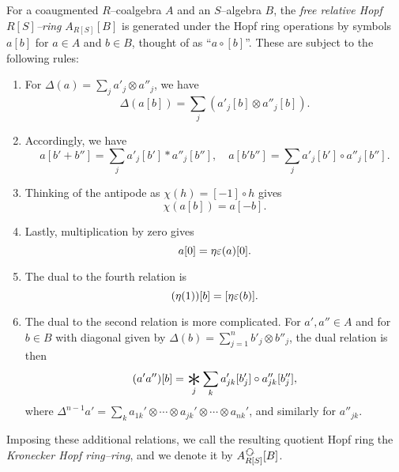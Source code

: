 \begin{definition}\label{DefnAlgebraicModelOfCoopns}
For a coaugmented \(R\)--coalgebra \(A\) and an \(S\)--algebra \(B\), the \textit{free relative Hopf \(R[S]\)--ring} \(A_{R[S]}[B]\) is generated under the Hopf ring operations by symbols \(a[b]\) for \(a \in A\) and \(b \in B\), thought of as ``\(a \circ [b]\)''.  These are subject to the following rules:
\begin{enumerate}
    \item For \(\Delta(a) = \sum_j a'_j \otimes a''_j\), we have \[\Delta(a[b]) = \sum_j (a'_j[b] \otimes a''_j[b]).\]
    \item Accordingly, we have \[a [b' + b''] = \sum_j a'_j[b'] \ast a''_j[b''], \quad a [b' b''] = \sum_j a'_j[b'] \circ a''_j[b''].\]
    \item Thinking of the antipode as \(\chi(h) = [-1] \circ h\) gives \[\chi(a[b]) = a[-b].\]
    \item Lastly, multiplication by zero gives \[a[0] = \eta\varepsilon(a)[0].\]
    \item The dual to the fourth relation is \[(\eta(1))[b] = [\eta\varepsilon(b)].\]
    \item The dual to the second relation is more complicated.  For \(a', a'' \in A\) and for \(b \in B\) with diagonal given by \(\Delta(b) = \sum_{j=1}^n b'_j \otimes b''_j\), the dual relation is then \[(a'a'')[b] = \bigast_j \sum_k a_{jk}'[b'_j] \circ a_{jk}''[b''_j],\] where \(\Delta^{n-1} a' = \sum_k a_{1k}' \otimes \cdots \otimes a_{jk}' \otimes \cdots \otimes a_{nk}'\), and similarly for \(a''_{jk}\).
\end{enumerate}
Imposing these additional relations, we call the resulting quotient Hopf ring the \textit{Kronecker Hopf ring--ring}, and we denote it by \(A_{R[S]}^{\circulatearrows}[B]\).
\end{definition}


